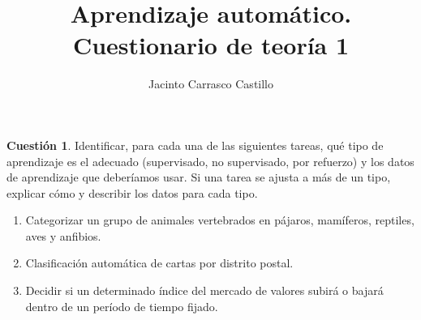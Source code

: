 \documentclass[11pt,leqno]{article}
\title{Aprendizaje autom\'atico. Cuestionario de teor\'ia 1}
\author{Jacinto Carrasco Castillo}
\theoremstyle{definition}
\begin{document}
\maketitle

\newtheorem{cuestion}{Cuestión}
\newtheorem{solucion}{Solución}

\begin{cuestion}
Identificar, para cada una de las siguientes tareas, qué tipo de aprendizaje es el adecuado (supervisado, no supervisado, por refuerzo) y los datos de aprendizaje que deberíamos usar. Si una tarea se ajusta a más de un tipo, explicar cómo y describir los datos para cada tipo.

\begin{enumerate}[a]
\item Categorizar un grupo de animales vertebrados en pájaros, mamíferos, reptiles, aves y anfibios.
\item Clasificación automática de cartas por distrito postal.
\item Decidir si un determinado índice del mercado de valores subirá o bajará dentro de un período de tiempo fijado.
\end{enumerate}
\end{cuestion}
\end{document}

